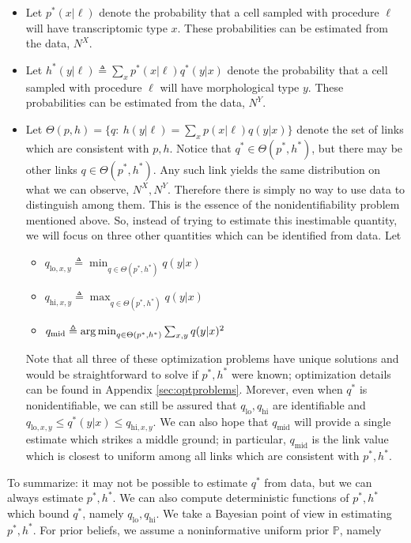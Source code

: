 \begin{itemize}
    \item Let $p^*(x|\ell)$ denote the probability that a cell sampled with procedure $\ell$ will have transcriptomic type $x$.  These probabilities can be estimated from the data, $N^X$.
    \item Let $h^*(y|\ell) \triangleq \sum_x p^*(x|\ell)q^*(y|x)$ denote the probability that a cell sampled with procedure $\ell$ will have morphological type $y$.  These probabilities can be estimated from the data, $N^Y$.
    \item Let $\Theta(p,h)=\{q:\ h(y|\ell) = \sum_x p(x|\ell)q(y|x)\}$ denote the set of links which are consistent with $p,h$.  Notice that $q^*\in\Theta(p^*,h^*)$, but there may be other links $q\in\Theta(p^*,h^*)$.  Any such link yields the same distribution on what we can observe, $N^X,N^Y$.  Therefore there is simply no way to use data to distinguish among them.  This is the essence of the nonidentifiability problem mentioned above.  So, instead of trying to estimate this inestimable quantity, we will focus on three other quantities which can be identified from data.  Let
    \begin{itemize}
        \item $q_{\mathrm{lo},x,y} \triangleq \min_{q\in \Theta(p^*,h^*)} q(y|x)$
        \item $q_{\mathrm{hi},x,y} \triangleq \max_{q\in \Theta(p^*,h^*)} q(y|x)$ 
        \item $q_{\mathrm{mid}} \triangleq \operatorname*{arg\,min}_{q\in \Theta(p^*,h^*)} \sum_{x,y} q(y|x)^2$
    \end{itemize}
    Note that all three of these optimization problems have unique solutions and would be straightforward to solve if $p^*,h^*$ were known; optimization details can be found in Appendix \ref{sec:optproblems}.  Morever, even when $q^*$ is nonidentifiable, we can still be assured that $q_{\mathrm{lo}}, q_{\mathrm{hi}}$ are identifiable and $q_{\mathrm{lo},x,y} \leq q^*(y|x) \leq q_{\mathrm{hi},x,y}$.  We can also hope that $q_{\mathrm{mid}}$ will provide a single estimate which strikes a middle ground; in particular, $q_{\mathrm{mid}}$ is the link value which is closest to uniform among all links which are consistent with $p^*,h^*$.  
\end{itemize}  
To summarize: it may not be possible to estimate $q^*$ from data, but we can always estimate $p^*,h^*$.  We can also compute deterministic functions of $p^*,h^*$ which bound $q^*$, namely $q_{\mathrm{lo}},q_{\mathrm{hi}}$.  We take a Bayesian point of view in estimating $p^*,h^*$.  For prior beliefs, we assume a noninformative uniform prior $\mathbb{P}$, namely
